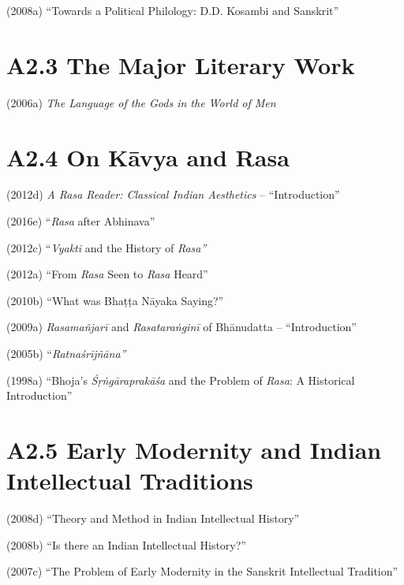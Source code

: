 (2008a) “Towards a Political Philology: D.D. Kosambi and Sanskrit”

\vspace{-.4cm}

\section*{A2.3 The Major Literary Work}

(2006a) \textit{The Language of the Gods in the World of Men}

\vspace{-.4cm}

\section*{A2.4 On Kāvya and Rasa}

(2012d) \textit{A Rasa Reader: Classical Indian Aesthetics} – “Introduction” 

(2016e) “\textit{Rasa} after Abhinava”

(2012c) “\textit{Vyakti} and the History of \textit{Rasa”}

(2012a) “From \textit{Rasa} Seen to \textit{Rasa} Heard”

(2010b) “What was Bhaṭṭa Nāyaka Saying?”

(2009a) \textit{Rasamañjarī} and \textit{Rasataraṅginī} of Bhānudatta – “Introduction”

(2005b) “\textit{Ratnaśrījñāna”}

(1998a) “Bhoja's \textit{Śṛṅgāraprakāśa} and the Problem of \textit{Rasa}: A Historical Introduction”

\vspace{-.3cm}

\section*{A2.5 Early Modernity and Indian Intellectual Traditions}

(2008d) “Theory and Method in Indian Intellectual History”

(2008b) “Is there an Indian Intellectual History?”

(2007c) “The Problem of Early Modernity in the Sanskrit Intellectual Tradition”

